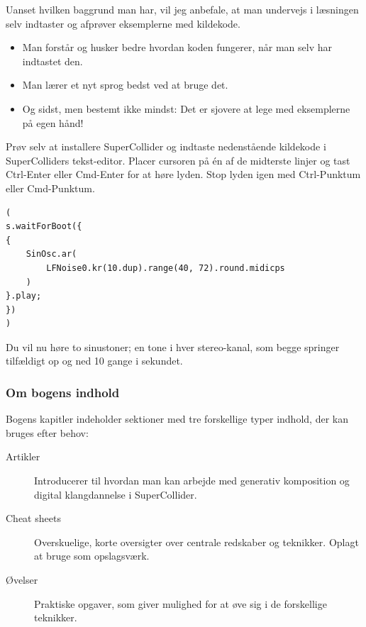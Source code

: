 Uanset hvilken baggrund man har, vil jeg anbefale, at man undervejs i læsningen selv indtaster og afprøver eksemplerne med kildekode.

\begin{itemize}
\item Man forstår og husker bedre hvordan koden fungerer, når man selv har indtastet den.
\item Man lærer et nyt sprog bedst ved at bruge det.
\item Og sidst, men bestemt ikke mindst: Det er sjovere at lege med eksemplerne på egen hånd! 
\end{itemize}

Prøv selv at installere SuperCollider og indtaste nedenstående kildekode i SuperColliders tekst-editor. Placer cursoren på én af de midterste linjer og tast Ctrl-Enter eller Cmd-Enter for at høre lyden. Stop lyden igen med Ctrl-Punktum eller Cmd-Punktum.

\begin{listing}[H]
\begin{verbatim}
(
s.waitForBoot({
{
    SinOsc.ar(
        LFNoise0.kr(10.dup).range(40, 72).round.midicps
    )
}.play;
})
)
\end{verbatim}
\caption{En tilfældig LFO styrer en sinustone-oscillator}
\end{listing}

Du vil nu høre to sinustoner; en tone i hver stereo-kanal, som begge springer tilfældigt op og ned 10 gange i sekundet. 

\subsubsection{Om bogens indhold}

Bogens kapitler indeholder sektioner med tre forskellige typer indhold, der kan bruges efter behov:

\begin{description}
\item[Artikler]
Introducerer til hvordan man kan arbejde med generativ komposition og digital klangdannelse i SuperCollider.
\item[\colorbox{cheatsheet}{Cheat sheets}]
Overskuelige, korte oversigter over centrale redskaber og teknikker. Oplagt at bruge som opslagsværk.
\item[\colorbox{exercise}{Øvelser}]
Praktiske opgaver, som giver mulighed for at øve sig i de forskellige teknikker.
\end{description}

